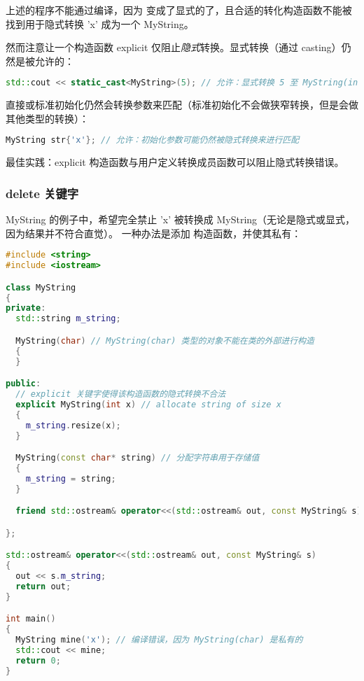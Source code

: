 \documentclass[../../LearnCpp.tex]{subfiles}
\begin{document}
上述的程序不能通过编译，因为  变成了显式的了，且合适的转化构造函数不能被找到用于隐式转换 'x' 成为一个 MyString。

然而注意让一个构造函数 explicit 仅阻止\textit{隐式}转换。显式转换（通过 casting）仍然是被允许的：

\begin{lstlisting}[language=C++]
std::cout << static_cast<MyString>(5); // 允许：显式转换 5 至 MyString(int)
\end{lstlisting}

直接或标准初始化仍然会转换参数来匹配（标准初始化不会做狭窄转换，但是会做其他类型的转换）：

\begin{lstlisting}[language=C++]
MyString str{'x'}; // 允许：初始化参数可能仍然被隐式转换来进行匹配
\end{lstlisting}

最佳实践：explicit 构造函数与用户定义转换成员函数可以阻止隐式转换错误。

\subsubsection*{delete 关键字}

MyString 的例子中，希望完全禁止 'x' 被转换成 MyString（无论是隐式或显式，因为结果并不符合直觉）。
一种办法是添加  构造函数，并使其私有：

\begin{lstlisting}[language=C++]
#include <string>
#include <iostream>

class MyString
{
private:
  std::string m_string;

  MyString(char) // MyString(char) 类型的对象不能在类的外部进行构造
  {
  }

public:
  // explicit 关键字使得该构造函数的隐式转换不合法
  explicit MyString(int x) // allocate string of size x
  {
    m_string.resize(x);
  }

  MyString(const char* string) // 分配字符串用于存储值
  {
    m_string = string;
  }

  friend std::ostream& operator<<(std::ostream& out, const MyString& s);

};

std::ostream& operator<<(std::ostream& out, const MyString& s)
{
  out << s.m_string;
  return out;
}

int main()
{
  MyString mine('x'); // 编译错误，因为 MyString(char) 是私有的
  std::cout << mine;
  return 0;
}
\end{lstlisting}
\end{document}
